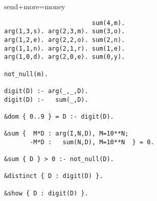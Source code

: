 \begin{frame}[fragile,shrink=1]{send+more=money}
\begin{lstlisting}
                        sum(4,m).
arg(1,3,s). arg(2,3,m). sum(3,o).
arg(1,2,e). arg(2,2,o). sum(2,n).
arg(1,1,n). arg(2,1,r). sum(1,e).
arg(1,0,d). arg(2,0,e). sum(0,y).

not_null(m).

digit(D) :- arg(_,_,D).
digit(D) :-   sum(_,D).

&dom { 0..9 } = D :- digit(D).

&sum {  M*D : arg(I,N,D), M=10**N;
       -M*D :   sum(N,D), M=10**N  } = 0.

&sum { D } > 0 :- not_null(D).

&distinct { D : digit(D) }.

&show { D : digit(D) }.
\end{lstlisting}
\end{frame}
%
